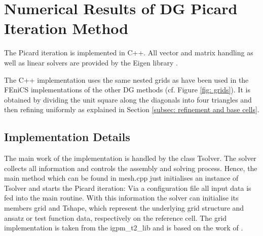 
\newpage

\section{Numerical Results of DG Picard Iteration Method} \label{sec: numerical results our Method}

The Picard iteration is implemented in C++. All vector and matrix handling as well as linear solvers are provided by the Eigen library \cite{eigenweb}. %

The C++ implementation uses the same nested grids as have been used in the FEniCS implementations of the other DG methods (cf. Figure \ref{fig: grids}). It is obtained by dividing the unit square along the diagonals into four triangles and then refining uniformly as explained in Section \ref{subsec: refinement and base cells}.

\subsection{Implementation Details}

The main work of the implementation is handled by the class Tsolver. The solver collects all information and controls the assembly and solving process.
Hence, the main method which can be found in mesh.cpp just initialises an instance of Tsolver and starts the Picard iteration: Via a configuration file all input data is fed into the main routine. With this information the solver can initialise its members grid and Tshape, which represent the underlying grid structure and ansatz or test function data, respectively on the reference cell. 
The grid implementation is taken from the igpm\_t2\_lib and is based on the work of \cite{BMV2009}.

